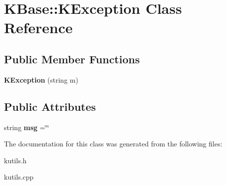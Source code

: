 \hypertarget{class_k_base_1_1_k_exception}{\section{K\-Base\-:\-:K\-Exception Class Reference}
\label{class_k_base_1_1_k_exception}
}
\subsection*{Public Member Functions}
\begin{DoxyCompactItemize}
\item 
\hypertarget{class_k_base_1_1_k_exception_a3bbce941dab9a8e3cc5ae3e747b03c0a}{{\bfseries K\-Exception} (string m)}\label{class_k_base_1_1_k_exception_a3bbce941dab9a8e3cc5ae3e747b03c0a}

\end{DoxyCompactItemize}
\subsection*{Public Attributes}
\begin{DoxyCompactItemize}
\item 
\hypertarget{class_k_base_1_1_k_exception_a92ce81f7caeceffd00dde7dfeea2eb35}{string {\bfseries msg} =\char`\"{}\char`\"{}}\label{class_k_base_1_1_k_exception_a92ce81f7caeceffd00dde7dfeea2eb35}

\end{DoxyCompactItemize}


The documentation for this class was generated from the following files\-:\begin{DoxyCompactItemize}
\item 
kutils.\-h\item 
kutils.\-cpp\end{DoxyCompactItemize}
